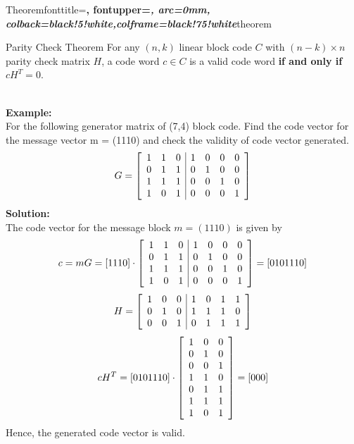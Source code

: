   {Theorem}{fonttitle=\bfseries\upshape, fontupper=\slshape,
     arc=0mm, colback=black!5!white,colframe=black!75!white}{theorem}

\begin{theo}{Parity Check Theorem}{}
    For any $(n, k)$ linear block code $C$ with $(n-k)\times n$ parity check matrix $H$, a code word $c \in C$ is a valid code word \textbf{if and only if} $cH^{T}=0$.
    \par\noindent\dotfill \\
    \textbf{Example:}\\
    For the following generator matrix of (7,4) block code. Find the code vector for the message vector m = (1110) and check the validity of code vector generated.
    \[
    G = \left[ \begin{array}{c c c | c c c c}
        1 & 1 & 0 & 1 & 0 & 0 & 0 \\
        0 & 1 & 1 & 0 & 1 & 0 & 0 \\
        1 & 1 & 1 & 0 & 0 & 1 & 0 \\
        1 & 0 & 1 & 0 & 0 & 0 & 1 
    \end{array} \right]
    \]
    \textbf{Solution:}\\
    The code vector for the message block $m = (1110)$ is given by
    \[
    c = mG = [1 1 1 0] \cdot \left[ \begin{array}{c c c | c c c c}
        1 & 1 & 0 & 1 & 0 & 0 & 0 \\
        0 & 1 & 1 & 0 & 1 & 0 & 0 \\
        1 & 1 & 1 & 0 & 0 & 1 & 0 \\
        1 & 0 & 1 & 0 & 0 & 0 & 1 
    \end{array} \right] = [0 1 0 1 1 1 0]
    \]
    \[
    H = \left[ \begin{array}{c c c | c c c c}
        1 & 0 & 0 & 1 & 0 & 1 & 1 \\
        0 & 1 & 0 & 1 & 1 & 1 & 0 \\
        0 & 0 & 1 & 0 & 1 & 1 & 1 
    \end{array} \right]
    \]
    \[
    cH^T = [0 1 0 1 1 1 0] \cdot \left[ \begin{array}{c c c}
        1 & 0 & 0 \\
        0 & 1 & 0 \\
        0 & 0 & 1 \\
        1 & 1 & 0 \\
        0 & 1 & 1 \\
        1 & 1 & 1 \\
        1 & 0 & 1 
    \end{array} \right] = [0 0 0]
    \]
    Hence, the generated code vector is valid.
\end{theo}

